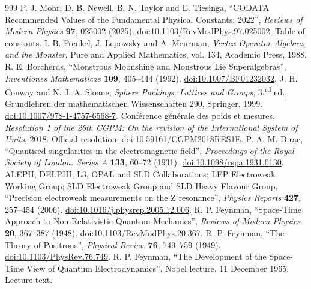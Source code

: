 \begin{thebibliography}{999}
 P. J. Mohr, D. B. Newell, B. N. Taylor and E. Tiesinga, ``CODATA Recommended Values of the Fundamental Physical Constants: 2022'', \emph{Reviews of Modern Physics} \textbf{97}, 025002 (2025). \href{https://doi.org/10.1103/RevModPhys.97.025002}{doi:10.1103/RevModPhys.97.025002}. \href{https://physics.nist.gov/cuu/Constants/Table/allascii.txt}{Table of constants}.
 I. B. Frenkel, J. Lepowsky and A. Meurman, \emph{Vertex Operator Algebras and the Monster}, Pure and Applied Mathematics, vol. 134, Academic Press, 1988.
 R. E. Borcherds, ``Monstrous Moonshine and Monstrous Lie Superalgebras'', \emph{Inventiones Mathematicae} \textbf{109}, 405--444 (1992). \href{https://doi.org/10.1007/BF01232032}{doi:10.1007/BF01232032}.
 J. H. Conway and N. J. A. Sloane, \emph{Sphere Packings, Lattices and Groups}, 3.\textsuperscript{rd} ed., Grundlehren der mathematischen Wissenschaften 290, Springer, 1999. \href{https://doi.org/10.1007/978-1-4757-6568-7}{doi:10.1007/978-1-4757-6568-7}.
 Conférence générale des poids et mesures, \emph{Resolution 1 of the 26th CGPM: On the revision of the International System of Units}, 2018. \href{https://www.bipm.org/en/committees/cg/cgpm/26-2018/resolution-1}{Official resolution}. \href{https://doi.org/10.59161/CGPM2018RES1E}{doi:10.59161/CGPM2018RES1E}.
 P. A. M. Dirac, ``Quantised singularities in the electromagnetic field'', \emph{Proceedings of the Royal Society of London. Series A} \textbf{133}, 60--72 (1931). \href{https://doi.org/10.1098/rspa.1931.0130}{doi:10.1098/rspa.1931.0130}.
 ALEPH, DELPHI, L3, OPAL and SLD Collaborations; LEP Electroweak Working Group; SLD Electroweak Group and SLD Heavy Flavour Group, ``Precision electroweak measurements on the Z resonance'', \emph{Physics Reports} \textbf{427}, 257--454 (2006). \href{https://doi.org/10.1016/j.physrep.2005.12.006}{doi:10.1016/j.physrep.2005.12.006}.
 R. P. Feynman, ``Space-Time Approach to Non-Relativistic Quantum Mechanics'', \emph{Reviews of Modern Physics} \textbf{20}, 367--387 (1948). \href{https://doi.org/10.1103/RevModPhys.20.367}{doi:10.1103/RevModPhys.20.367}.
 R. P. Feynman, ``The Theory of Positrons'', \emph{Physical Review} \textbf{76}, 749--759 (1949). \href{https://doi.org/10.1103/PhysRev.76.749}{doi:10.1103/PhysRev.76.749}.
 R. P. Feynman, ``The Development of the Space-Time View of Quantum Electrodynamics'', Nobel lecture, 11 December 1965. \href{https://www.nobelprize.org/prizes/physics/1965/feynman/lecture/}{Lecture text}.

\end{thebibliography}
